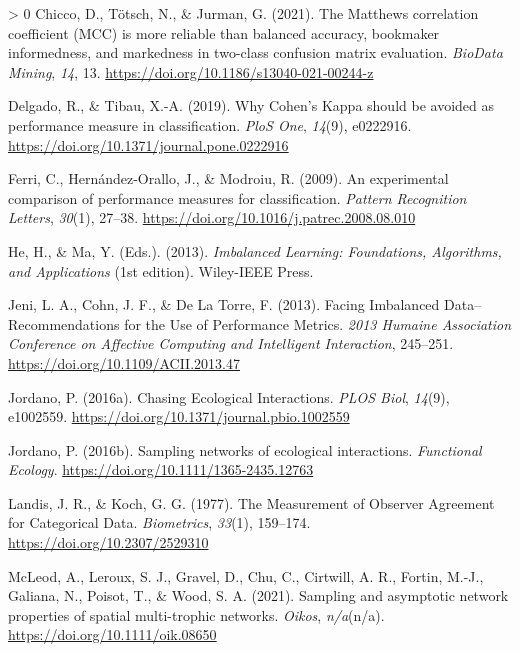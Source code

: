 \documentclass[11pt]{article}
\newlength{\cslhangindent}
\newenvironment{CSLReferences}[3] %
 {%
  \setlength{\parindent}{0pt}
  \ifodd #1 \everypar{\setlength{\hangindent}{\cslhangindent}}\ignorespaces\fi
  \ifnum #2 > 0
  \setlength{\parskip}{#2\baselineskip}
  \fi
 }%
 {}
\begin{document}
\begin{CSLReferences}{1}{0}
\leavevmode\hypertarget{ref-Chicco2021MatCor}{}%
Chicco, D., Tötsch, N., \& Jurman, G. (2021). The Matthews correlation
coefficient (MCC) is more reliable than balanced accuracy, bookmaker
informedness, and markedness in two-class confusion matrix evaluation.
\emph{BioData Mining}, \emph{14}, 13.
\url{https://doi.org/10.1186/s13040-021-00244-z}

\leavevmode\hypertarget{ref-Delgado2019WhyCoh}{}%
Delgado, R., \& Tibau, X.-A. (2019). Why Cohen's Kappa should be avoided
as performance measure in classification. \emph{PloS One}, \emph{14}(9),
e0222916. \url{https://doi.org/10.1371/journal.pone.0222916}

\leavevmode\hypertarget{ref-Ferri2009ExpCom}{}%
Ferri, C., Hernández-Orallo, J., \& Modroiu, R. (2009). An experimental
comparison of performance measures for classification. \emph{Pattern
Recognition Letters}, \emph{30}(1), 27--38.
\url{https://doi.org/10.1016/j.patrec.2008.08.010}

\leavevmode\hypertarget{ref-He2013ImbLea}{}%
He, H., \& Ma, Y. (Eds.). (2013). \emph{Imbalanced Learning:
Foundations, Algorithms, and Applications} (1st edition). Wiley-IEEE
Press.

\leavevmode\hypertarget{ref-Jeni2013FacImb}{}%
Jeni, L. A., Cohn, J. F., \& De La Torre, F. (2013). Facing Imbalanced
Data--Recommendations for the Use of Performance Metrics. \emph{2013
Humaine Association Conference on Affective Computing and Intelligent
Interaction}, 245--251. \url{https://doi.org/10.1109/ACII.2013.47}

\leavevmode\hypertarget{ref-Jordano2016ChaEco}{}%
Jordano, P. (2016a). Chasing Ecological Interactions. \emph{PLOS Biol},
\emph{14}(9), e1002559.
\url{https://doi.org/10.1371/journal.pbio.1002559}

\leavevmode\hypertarget{ref-Jordano2016SamNet}{}%
Jordano, P. (2016b). Sampling networks of ecological interactions.
\emph{Functional Ecology}. \url{https://doi.org/10.1111/1365-2435.12763}

\leavevmode\hypertarget{ref-Landis1977MeaObs}{}%
Landis, J. R., \& Koch, G. G. (1977). The Measurement of Observer
Agreement for Categorical Data. \emph{Biometrics}, \emph{33}(1),
159--174. \url{https://doi.org/10.2307/2529310}

\leavevmode\hypertarget{ref-McLeod2021SamAsy}{}%
McLeod, A., Leroux, S. J., Gravel, D., Chu, C., Cirtwill, A. R., Fortin,
M.-J., Galiana, N., Poisot, T., \& Wood, S. A. (2021). Sampling and
asymptotic network properties of spatial multi-trophic networks.
\emph{Oikos}, \emph{n/a}(n/a). \url{https://doi.org/10.1111/oik.08650}


\end{CSLReferences}
\end{document}
